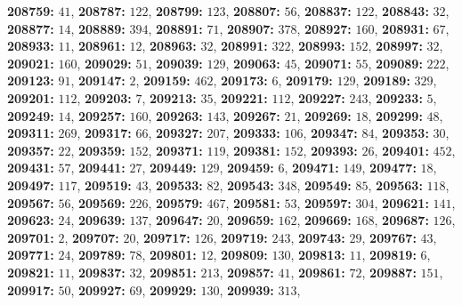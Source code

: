 \textsf{\bfseries 208759:} $41$, \textsf{\bfseries 208787:} $122$, \textsf{\bfseries 208799:} $123$, \textsf{\bfseries 208807:} $56$, \textsf{\bfseries 208837:} $122$, \textsf{\bfseries 208843:} $32$, \textsf{\bfseries 208877:} $14$, \textsf{\bfseries 208889:} $394$, \textsf{\bfseries 208891:} $71$, \textsf{\bfseries 208907:} $378$, \textsf{\bfseries 208927:} $160$, \textsf{\bfseries 208931:} $67$, \textsf{\bfseries 208933:} $11$, \textsf{\bfseries 208961:} $12$, \textsf{\bfseries 208963:} $32$, \textsf{\bfseries 208991:} $322$, \textsf{\bfseries 208993:} $152$, \textsf{\bfseries 208997:} $32$, \textsf{\bfseries 209021:} $160$, \textsf{\bfseries 209029:} $51$, \textsf{\bfseries 209039:} $129$, \textsf{\bfseries 209063:} $45$, \textsf{\bfseries 209071:} $55$, \textsf{\bfseries 209089:} $222$, \textsf{\bfseries 209123:} $91$, \textsf{\bfseries 209147:} $2$, \textsf{\bfseries 209159:} $462$, \textsf{\bfseries 209173:} $6$, \textsf{\bfseries 209179:} $129$, \textsf{\bfseries 209189:} $329$, \textsf{\bfseries 209201:} $112$, \textsf{\bfseries 209203:} $7$, \textsf{\bfseries 209213:} $35$, \textsf{\bfseries 209221:} $112$, \textsf{\bfseries 209227:} $243$, \textsf{\bfseries 209233:} $5$, \textsf{\bfseries 209249:} $14$, \textsf{\bfseries 209257:} $160$, \textsf{\bfseries 209263:} $143$, \textsf{\bfseries 209267:} $21$, \textsf{\bfseries 209269:} $18$, \textsf{\bfseries 209299:} $48$, \textsf{\bfseries 209311:} $269$, \textsf{\bfseries 209317:} $66$, \textsf{\bfseries 209327:} $207$, \textsf{\bfseries 209333:} $106$, \textsf{\bfseries 209347:} $84$, \textsf{\bfseries 209353:} $30$, \textsf{\bfseries 209357:} $22$, \textsf{\bfseries 209359:} $152$, \textsf{\bfseries 209371:} $119$, \textsf{\bfseries 209381:} $152$, \textsf{\bfseries 209393:} $26$, \textsf{\bfseries 209401:} $452$, \textsf{\bfseries 209431:} $57$, \textsf{\bfseries 209441:} $27$, \textsf{\bfseries 209449:} $129$, \textsf{\bfseries 209459:} $6$, \textsf{\bfseries 209471:} $149$, \textsf{\bfseries 209477:} $18$, \textsf{\bfseries 209497:} $117$, \textsf{\bfseries 209519:} $43$, \textsf{\bfseries 209533:} $82$, \textsf{\bfseries 209543:} $348$, \textsf{\bfseries 209549:} $85$, \textsf{\bfseries 209563:} $118$, \textsf{\bfseries 209567:} $56$, \textsf{\bfseries 209569:} $226$, \textsf{\bfseries 209579:} $467$, \textsf{\bfseries 209581:} $53$, \textsf{\bfseries 209597:} $304$, \textsf{\bfseries 209621:} $141$, \textsf{\bfseries 209623:} $24$, \textsf{\bfseries 209639:} $137$, \textsf{\bfseries 209647:} $20$, \textsf{\bfseries 209659:} $162$, \textsf{\bfseries 209669:} $168$, \textsf{\bfseries 209687:} $126$, \textsf{\bfseries 209701:} $2$, \textsf{\bfseries 209707:} $20$, \textsf{\bfseries 209717:} $126$, \textsf{\bfseries 209719:} $243$, \textsf{\bfseries 209743:} $29$, \textsf{\bfseries 209767:} $43$, \textsf{\bfseries 209771:} $24$, \textsf{\bfseries 209789:} $78$, \textsf{\bfseries 209801:} $12$, \textsf{\bfseries 209809:} $130$, \textsf{\bfseries 209813:} $11$, \textsf{\bfseries 209819:} $6$, \textsf{\bfseries 209821:} $11$, \textsf{\bfseries 209837:} $32$, \textsf{\bfseries 209851:} $213$, \textsf{\bfseries 209857:} $41$, \textsf{\bfseries 209861:} $72$, \textsf{\bfseries 209887:} $151$, \textsf{\bfseries 209917:} $50$, \textsf{\bfseries 209927:} $69$, \textsf{\bfseries 209929:} $130$, \textsf{\bfseries 209939:} $313$, 
